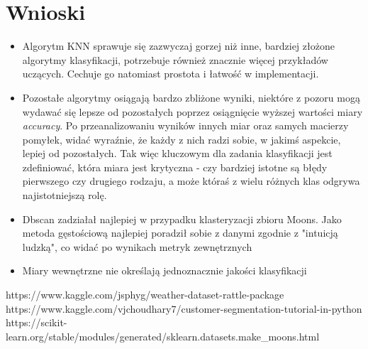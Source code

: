 \documentclass{classrep}
\begin{document}
    \section{Wnioski}
    \label{conclusions} {
        \begin{itemize}
            \item Algorytm KNN sprawuje się zazwyczaj gorzej niż inne, bardziej złożone
            algorytmy klasyfikacji, potrzebuje również znacznie więcej przykładów
            uczących. Cechuje go natomiast prostota i łatwość w implementacji.
            \item Pozostałe algorytmy osiągają bardzo zbliżone wyniki, niektóre z
            pozoru mogą wydawać się lepsze od pozostałych poprzez osiągnięcie
            wyższej wartości miary \emph{accuracy}. Po przeanalizowaniu wyników
            innych miar oraz samych macierzy pomyłek, widać wyraźnie, że każdy z
            nich radzi sobie, w jakimś aspekcie, lepiej od pozostałych. Tak więc
            kluczowym dla zadania klasyfikacji jest zdefiniować, która miara jest
            krytyczna - czy bardziej istotne są błędy pierwszego czy drugiego
            rodzaju, a może któraś z wielu różnych klas odgrywa najistotniejszą
            rolę.
            \item Dbscan zadziałał najlepiej w przypadku klasteryzacji zbioru Moons.
            Jako metoda gęstościową najlepiej poradził sobie z danymi zgodnie z
            "intuicją ludzką", co widać po wynikach metryk zewnętrznych
            \item Miary wewnętrzne nie określają jednoznacznie jakości klasyfikacji
        \end{itemize}
    }

    \begin{thebibliography}{0}
        {https://www.kaggle.com/jsphyg/weather-dataset-rattle-package}
        {https://www.kaggle.com/vjchoudhary7/customer-segmentation-tutorial-in-python}
        {https://scikit-learn.org/stable/modules/generated/sklearn.datasets.make\_moons.html}
    \end{thebibliography}
\end{document}
